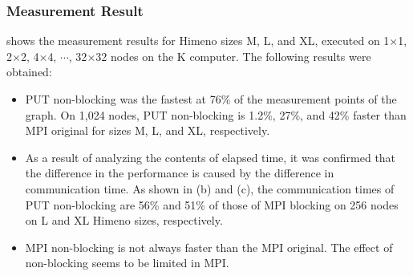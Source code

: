 \subsubsection{Measurement Result}

 shows the measurement results for Himeno sizes M, L, and XL,
executed on 1$\times$1, 2$\times$2, 4$\times$4, $\cdots$, 32$\times$32 nodes on the
K computer. The following results were obtained:
\begin{itemize}
\item
PUT non-blocking was the fastest at 76\% of the measurement points of the graph. 
On 1,024 nodes, PUT non-blocking is 1.2\%, 27\%, and 42\% faster than MPI original for sizes M, L, 
and XL, respectively.

\item
As a result of analyzing the contents of elapsed time, it was confirmed that the
difference in the performance is caused by the difference in communication
time. As shown in (b) and (c), the communication times of PUT non-blocking are
56\% and 51\% of those of MPI blocking on 256 nodes on L and XL Himeno sizes, respectively.

\item
MPI non-blocking is not always faster than the MPI original. The effect of 
non-blocking seems to be limited in MPI.

\end{itemize}

